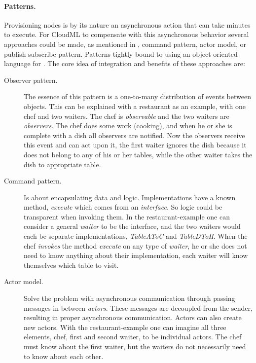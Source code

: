 \paragraph{Patterns.}

Provisioning nodes is by its nature an asynchronous action that can take minutes to execute.
For CloudML to compensate with this asynchronous behavior several approaches could be made,
as mentioned in , \eg command pattern, actor model,
or publish-subscribe pattern.
Patterns tightly bound to using an object-oriented language for .
The core idea of integration and benefits of these approaches are:
\begin{description}
  \item[Observer pattern.] The essence of this pattern is a one-to-many distribution of events between objects.
    This can be explained with a restaurant as an example, with one chef and two waiters.
    The chef is \emph{observable} and the two waiters are \emph{observers}.
    The chef does some work (cooking), and when he or she is complete with a dish all observers are notified.
    Now the observers receive this event and can act upon it, 
    \eg the first waiter ignores the dish because it does not belong to any of his or her tables, 
    while the other waiter takes the dish to appropriate table.
  \item[Command pattern.] Is about encapsulating data and logic. 
    Implementations have a known method, \eg \emph{execute} which comes from an \emph{interface}.
    So logic could be transparent when invoking them.
    In the restaurant-example one can consider a general \emph{waiter} to be the interface,
    and the two waiters would each be separate implementations, 
    \eg \emph{TableAToC} and \emph{TableDToH}.
    When the chef \emph{invokes} the method \emph{execute} on any type of \emph{waiter}, 
    he or she does not need to know anything about their implementation, 
    each waiter will know themselves which table to visit.
  \item[Actor model.] Solve the problem with asynchronous communication through passing messages
    in between \emph{actors}.
    These messages are decoupled from the sender, resulting in proper asynchronous communication.
    Actors can also create new actors.
    With the restaurant-example one can imagine all three elements, \ie chef, first and second waiter,
    to be individual actors.
    The chef must know about the first waiter, 
    but the waiters do not necessarily need to know about each other.

\end{description}
